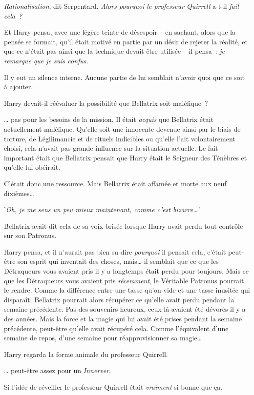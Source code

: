 \emph{Rationalisation}, dit Serpentard.
\emph{Alors pourquoi le professeur Quirrell} a-t-il \emph{fait cela~?}

Et Harry pensa, avec une légère teinte de désespoir -- en sachant, alors que la pensée se formait, qu'il était motivé en partie par un désir de rejeter la réalité, et que ce n'était pas ainsi que la technique devait être utilisée -- il pensa~: \emph{je remarque que je suis confus.}

Il y eut un silence interne.
Aucune partie de lui semblait n'avoir quoi que ce soit à ajouter.

Harry devait-il réévaluer la possibilité que Bellatrix soit maléfique~?

… pas pour les besoins de la mission.
Il était \emph{acquis} que Bellatrix était actuellement maléfique.
Qu'elle soit une innocente devenue ainsi par le biais de torture, de Légilimancie et de rituels indicibles ou qu'elle l'ait volontairement choisi, cela n'avait pas grande influence sur la situation actuelle.
Le fait important était que Bellatrix pensait que Harry était le Seigneur des Ténèbres et qu'elle lui obéirait.

C'était donc une ressource.
Mais Bellatrix était affamée et morte aux neuf dixièmes…

'\emph{Oh, je me sens un peu mieux maintenant, comme c'est bizarre…'}

Bellatrix avait dit cela de sa voix brisée lorsque Harry avait perdu tout contrôle sur son Patronus.

Harry pensa, et il n'aurait pas bien su dire \emph{pourquoi} il pensait cela, c'était peut-être son esprit qui inventait des choses, mais… il semblait que ce que les Détraqueurs vous avaient pris il y a longtemps était perdu pour toujours.
Mais ce que les Détraqueurs vous avaient pris \emph{récemment}, le Véritable Patronus pourrait le rendre.
Comme la différence entre une tasse qu'on vide et une tasse inusitée qui disparaît.
Bellatrix pourrait alors récupérer ce qu'elle avait perdu pendant la semaine précédente.
Pas des souvenirs heureux, ceux-là avaient été dévorés il y a des années.
Mais la force et la magie qui lui avait été prises pendant la semaine précédente, peut-être qu'elle avait récupéré cela.
Comme l'équivalent d'une semaine de repos, d'une semaine pour réapprovisionner sa magie…

Harry regarda la forme animale du professeur Quirrell.

… peut-être assez pour un \emph{Innerver}.

Si l'idée de réveiller le professeur Quirrell était \emph{vraiment} si bonne que ça.

